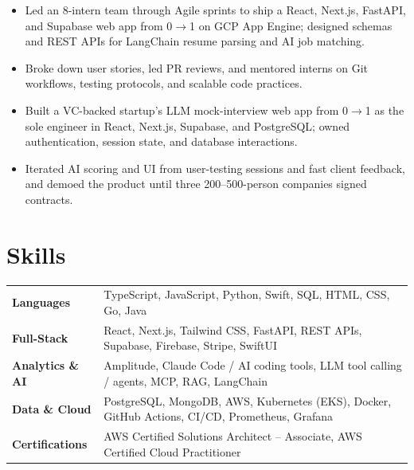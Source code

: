\documentclass[11pt, letterpaper]{article}
\begin{document}
\begin{itemize}
  \item Led an 8-intern team through Agile sprints to ship a React, Next.js, FastAPI, and Supabase web app from 0$\to$1 on GCP App Engine; designed schemas and REST APIs for LangChain resume parsing and AI job matching.
  \item Broke down user stories, led PR reviews, and mentored interns on Git workflows, testing protocols, and scalable code practices.
\end{itemize}

\begin{itemize}
  \item Built a VC-backed startup's LLM mock-interview web app from 0$\to$1 as the sole engineer in React, Next.js, Supabase, and PostgreSQL; owned authentication, session state, and database interactions.
  \item Iterated AI scoring and UI from user-testing sessions and fast client feedback, and demoed the product until three 200--500-person companies signed contracts.
\end{itemize}

\section{Skills}
\begin{tabularx}{\textwidth}{@{}l @{\hspace{7pt}} >{\raggedright\arraybackslash}X@{}}
  \textbf{Languages} & TypeScript, JavaScript, Python, Swift, SQL, HTML, CSS, Go, Java \\[1pt]
  \textbf{Full-Stack} & React, Next.js, Tailwind CSS, FastAPI, REST APIs, Supabase, Firebase, Stripe, SwiftUI \\[1pt]
  \textbf{Analytics \& AI} & Amplitude, Claude Code / AI coding tools, LLM tool calling / agents, MCP, RAG, LangChain \\[1pt]
  \textbf{Data \& Cloud} & PostgreSQL, MongoDB, AWS, Kubernetes (EKS), Docker, GitHub Actions, CI/CD, Prometheus, Grafana \\[1pt]
  \textbf{Certifications} & AWS Certified Solutions Architect -- Associate, AWS Certified Cloud Practitioner \\
\end{tabularx}
\end{document}

